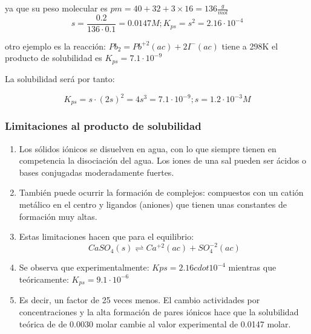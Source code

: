 ya que su peso molecular es $pm=40+32+3\times 16=136 \frac{g}{mol}$
\begin{equation*}
	s=\frac{0{.}2}{136\cdot 0{.}1}=0{.}0147M; K_{ps}=s^2=2{.}16\cdot 10^{-4}
\end{equation*}

otro ejemplo es la reacción: $Pb_2=Pb^{+2}(ac)+2I^-(ac)$ tiene a 298K el producto de solubilidad es
$K_{ps}=7{.}1\cdot 10^{-9}$

La solubilidad será por tanto:

\begin{equation*}
	K_{ps}=s\cdot (2s)^2=4s^3=7{.}1\cdot 10^{-9}; s=1{.}2\cdot 10^{-3}M
\end{equation*}




\subsubsection{Limitaciones al producto de solubilidad}

\begin{enumerate}
	\item Los sólidos iónicos se disuelven en agua, con lo que siempre tienen en
	      competencia la disociación del agua. Los iones de una sal pueden ser
	      ácidos o bases conjugadas moderadamente fuertes.
	\item También puede ocurrir la formación de complejos: compuestos con un
	      catión metálico en el centro y ligandos (aniones) que tienen unas
	      constantes de formación muy altas.
	\item Estas limitaciones hacen que para el equilibrio:
	      \begin{equation*}
		      CaSO_4(s)\rightleftharpoons Ca^{+2}(ac) + SO^{-2}_4(ac)
	      \end{equation*}
	\item Se observa que experimentalmente: $K{ps} = 2.16 cdot 10^{-4}$
	      mientras que teóricamente: $K_{ps} = 9.1\cdot 10^{-6}$
	\item Es decir, un factor de 25 veces menos. El cambio actividades por
	      concentraciones y la alta formación de pares iónicos hace que la
	      solubilidad teórica de de 0.0030 molar cambie al valor experimental
	      de 0.0147 molar.

\end{enumerate}

